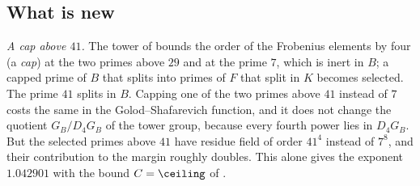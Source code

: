 

\subsection{What is new}\label{intro:new}
\emph{A cap above $41$.} The tower of \cite{Naslund04273} bounds the order
of the Frobenius elements by four (a \emph{cap}) at the two primes above
$29$ and at the prime $7$, which is inert in $B$; a capped prime of $B$
that splits into primes of $F$ that split in $K$ becomes selected. The
prime $41$ splits in $B$. Capping one of the two primes above $41$
instead of $7$ costs the same in the Golod--Shafarevich function, and it
does not change the quotient $G_B/D_4G_B$ of the tower group, because
every fourth power lies in $D_4G_B$. But
the selected primes above $41$ have residue field of order $41^4$ instead
of $7^8$, and their contribution to the margin roughly doubles. This
alone gives the exponent $1.042901$ with the bound $C=\ceiling$ of
\cite{Naslund04273}.

